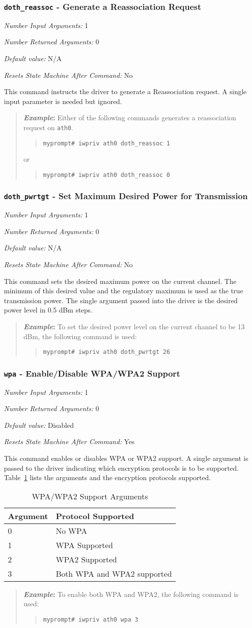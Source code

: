 \documentclass[10pt,fullpage]{article}
\newcommand{\mytt}[1]{{\texttt{#1}}}
\newcommand{\bv}{\begin{verse}}
\newcommand{\ev}{\end{verse}}
\newcommand{\cmd}[1]{{\texttt{myprompt\# #1}}}
\newcommand{\argdesc}[4]{\begin{description}
\itemsep -6pt
\item \textit{Number Input Arguments:} #1
\item \textit{Number Returned Arguments:} #2
\item \textit{Default value:} #3
\item \textit{Resets State Machine After Command:} #4
\end{description}
}
\newenvironment{example}{\begin{quote}\textbf{\textit{Example}:}}{\end{quote}}
\begin{document}
\subsubsection{\mytt{doth\_reassoc} - Generate a Reassociation Request}
\argdesc{1}{0}{N/A}{No}
This command instructs the driver to generate a Reassociation request.
A single input parameter is needed but ignored.
\begin{example}
  Either of the following commands generates a reassociation request
  on \mytt{ath0}.
  \bv
  \cmd{iwpriv ath0 doth\_reassoc 1}
  \ev
  or
  \bv
  \cmd{iwpriv ath0 doth\_reassoc 0}
  \ev
\end{example}

\subsubsection{\mytt{doth\_pwrtgt} - Set Maximum Desired Power for
  Transmission}
\argdesc{1}{0}{N/A}{No}
This command sets the desired maximum power on the current channel.
The minimum of this desired value and the regulatory maximum is used
as the true transmission power.  The single argument passed into the
driver is the desired power level in 0.5 dBm steps.
\begin{example}
  To set the desired power level on the current channel to be 13 dBm,
  the following command is used:
  \bv
  \cmd{iwpriv ath0 doth\_pwrtgt 26}
  \ev
\end{example}

\subsubsection{\mytt{wpa} - Enable/Disable WPA/WPA2 Support}
\argdesc{1}{0}{Disabled}{Yes}
This command enables or disables WPA or WPA2 support.  A single
argument is passed to the driver indicating which encryption protocols
is to be supported.  Table~\ref{tab:wpa} lists the arguments and the
encryption protocols supported.
\begin{table}
  \centering
  \begin{tabular}{|l|l|} \hline
    Argument & Protocol Supported \\ \hline
    0 & No WPA \\
    1 & WPA Supported \\
    2 & WPA2 Supported \\
    3 & Both WPA and WPA2 supported \\ \hline
  \end{tabular}
  \caption{WPA/WPA2 Support Arguments}
  \label{tab:wpa}
\end{table}
\begin{example}
  To enable both WPA and WPA2, the following command is used:
  \bv
  \cmd{iwpriv ath0 wpa 3}
  \ev
\end{example}
\end{document}
